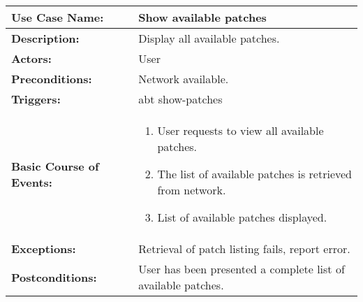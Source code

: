 
\begin{tabularx}{\linewidth}{|l|X|}
\hline
\textbf{Use Case Name:} & \textbf{Show available patches} \\
\hline
\textbf{Description:} & Display all available patches. \\
\hline
\textbf{Actors:} & User \\
\hline
\textbf{Preconditions:} & Network available. \\
\hline
\textbf{Triggers:} & abt show-patches \\
\hline
\textbf{Basic Course of Events:} & 
\begin{minipage}{\linewidth} 
  \vspace{0.05em}
  \begin{enumerate}
    \item User requests to view all available patches.
    \item The list of available patches is retrieved from network.
    \item List of available patches displayed.
  \end{enumerate}
  \vspace{0.05em}
\end{minipage}
\\
\hline 
\textbf{Exceptions:} & Retrieval of patch listing fails, report error. \\
\hline 
\textbf{Postconditions:} &
User has been presented a complete list of available patches. \\
\hline
\end{tabularx}

